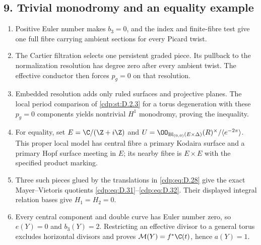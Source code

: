 \subsection*{9. Trivial monodromy and an equality example}
\RungOne
\begin{enumerate}[label=\arabic*.,leftmargin=*]
\item Positive Euler number makes $b_3=0$, and the index and
finite-fibre test give one full fibre carrying ambient sections
for every Picard twist.
\item The Cartier filtration selects one persistent graded
piece.  Its pullback to the normalization resolution has degree
zero after every ambient twist.  The effective conductor then
forces $p_g=0$ on that resolution.
\item Embedded resolution adds only ruled surfaces and projective
planes.  The local period comparison of \ref{cdp:st:D.2.3}
for a torus degeneration with these $p_g=0$ components yields
nontrivial $H^1$ monodromy, proving the inequality.
\item For equality, set $E=\C/(\Z+i\Z)$ and
$U=\OO_{\operatorname{Bl}_{(0,0)}(E\times\Delta)}(R)^\times/\langle e^{-2\pi}\rangle$.
This proper local model has central fibre a primary Kodaira
surface and a primary Hopf surface meeting in $E$; its nearby
fibre is $E\times E$ with the specified product marking.
\item Three such pieces glued by the translations in
\eqref{cdp:eq:D.28} give the exact Mayer--Vietoris quotients
\eqref{cdp:eq:D.31}--\eqref{cdp:eq:D.32}.  Their displayed
integral relation bases give $H_1=H_2=0$.
\item Every central component and double curve has Euler number
zero, so $e(Y)=0$ and $b_3(Y)=2$.  Restricting an effective
divisor to a general torus excludes horizontal divisors and
proves $\mathcal M(Y)=f^*\C(t)$, hence $a(Y)=1$.
\end{enumerate}

